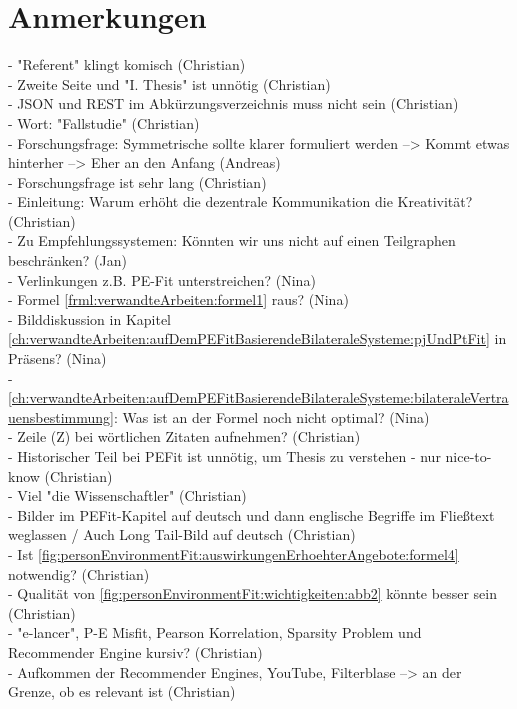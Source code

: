 \section{Anmerkungen}
\label{ch:fazit:anmerkungen}
- "Referent" klingt komisch (Christian)\\
- Zweite Seite und "I. Thesis" ist unnötig (Christian)\\
- JSON und REST im Abkürzungsverzeichnis muss nicht sein (Christian)\\
- Wort: "Fallstudie" (Christian)\\
- Forschungsfrage: Symmetrische sollte klarer formuliert werden --> Kommt etwas hinterher --> Eher an den Anfang (Andreas)\\
- Forschungsfrage ist sehr lang (Christian)\\
- Einleitung: Warum erhöht die dezentrale Kommunikation die Kreativität? (Christian)\\
- Zu Empfehlungssystemen: Könnten wir uns nicht auf einen Teilgraphen beschränken? (Jan)\\
- Verlinkungen z.B. PE-Fit unterstreichen? (Nina)\\
- Formel \ref{frml:verwandteArbeiten:formel1} raus? (Nina)\\
- Bilddiskussion in Kapitel \ref{ch:verwandteArbeiten:aufDemPEFitBasierendeBilateraleSysteme:pjUndPtFit} in Präsens? (Nina)\\
- \ref{ch:verwandteArbeiten:aufDemPEFitBasierendeBilateraleSysteme:bilateraleVertrauensbestimmung}: Was ist an der Formel noch nicht optimal? (Nina)\\
- Zeile (Z) bei wörtlichen Zitaten aufnehmen? (Christian)\\
- Historischer Teil bei \ac{PEFit} ist unnötig, um Thesis zu verstehen - nur nice-to-know (Christian)\\
- Viel "die Wissenschaftler" (Christian)\\
- Bilder im \ac{PEFit}-Kapitel auf deutsch und dann englische Begriffe im Fließtext weglassen / Auch Long Tail-Bild auf deutsch (Christian)\\
- Ist \ref{fig:personEnvironmentFit:auswirkungenErhoehterAngebote:formel4} notwendig? (Christian)\\
- Qualität von \ref{fig:personEnvironmentFit:wichtigkeiten:abb2} könnte besser sein (Christian)\\
- "e-lancer", P-E Misfit, Pearson Korrelation, Sparsity Problem und Recommender Engine kursiv? (Christian)\\
- Aufkommen der Recommender Engines, YouTube, Filterblase --> an der Grenze, ob es relevant ist (Christian)\\
